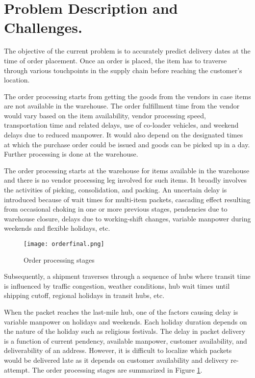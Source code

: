 \documentclass[twoside,leqno,twocolumn]{article}
\begin{document}
\section{Problem Description and Challenges.}
The objective of the current problem is to accurately predict delivery dates at the time of order placement. Once an order is placed, the item has to traverse through various touchpoints in the supply chain before reaching the customer's location.

The order processing starts from getting the goods from the vendors in case items are not available in the warehouse. The order fulfillment time from the vendor would vary based on the item availability, vendor processing speed, transportation time and related delays, use of co-loader vehicles, and weekend delays due to reduced manpower. It would also depend on the designated times at which the purchase order could be issued and goods can be picked up in a day. Further processing is done at the warehouse. 

The order processing starts at the warehouse for items available in the warehouse and there is no vendor processing leg involved for such items. It broadly involves the activities of picking, consolidation, and packing. An uncertain delay is introduced because of wait times for multi-item packets, cascading effect resulting from occasional choking in one or more previous stages, pendencies due to warehouse closure, delays due to working-shift changes, variable manpower during weekends and flexible holidays, etc. 


\begin{figure}[h]
\centering
    \texttt{[image: orderfinal.png]}
\caption{Order processing stages}
    \label{fig:orderproc}
    \vspace{-2mm}
\end{figure}

Subsequently, a shipment traverses through a sequence of hubs where transit time is influenced by traffic congestion, weather conditions, hub wait times until shipping cutoff, regional holidays in transit hubs, etc.

When the packet reaches the last-mile hub, one of the factors causing delay is variable manpower on holidays and weekends. Each holiday duration depends on the nature of the holiday such as religious festivals. The delay in packet delivery is a function of current pendency, available manpower, customer availability, and deliverability of an address. However, it is difficult to localize which packets would be delivered late as it depends on customer availability and delivery re-attempt. The order processing stages are summarized in Figure \ref{fig:orderproc}.
\end{document}
